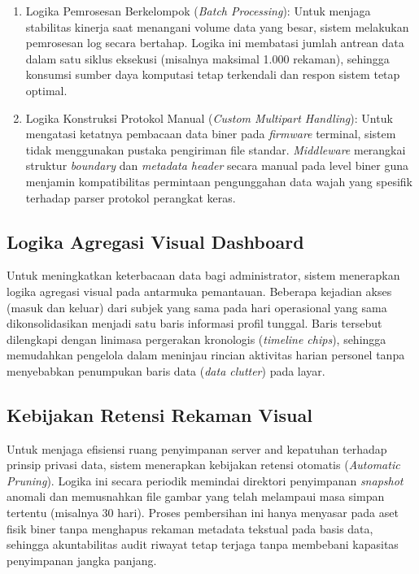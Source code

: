 \begin{enumerate}
    \item Logika Pemrosesan Berkelompok (\textit{Batch Processing}): Untuk menjaga stabilitas kinerja saat menangani volume data yang besar, sistem melakukan pemrosesan log secara bertahap. Logika ini membatasi jumlah antrean data dalam satu siklus eksekusi (misalnya maksimal 1.000 rekaman), sehingga konsumsi sumber daya komputasi tetap terkendali dan respon sistem tetap optimal.
    \item Logika Konstruksi Protokol Manual (\textit{Custom Multipart Handling}): Untuk mengatasi ketatnya pembacaan data biner pada \textit{firmware} terminal, sistem tidak menggunakan pustaka pengiriman file standar. \textit{Middleware} merangkai struktur \textit{boundary} dan \textit{metadata header} secara manual pada level biner guna menjamin kompatibilitas permintaan pengunggahan data wajah yang spesifik terhadap parser protokol perangkat keras.
\end{enumerate}

\subsection{Logika Agregasi Visual Dashboard}
Untuk meningkatkan keterbacaan data bagi administrator, sistem menerapkan logika agregasi visual pada antarmuka pemantauan. Beberapa kejadian akses (masuk dan keluar) dari subjek yang sama pada hari operasional yang sama dikonsolidasikan menjadi satu baris informasi profil tunggal. Baris tersebut dilengkapi dengan linimasa pergerakan kronologis (\textit{timeline chips}), sehingga memudahkan pengelola dalam meninjau rincian aktivitas harian personel tanpa menyebabkan penumpukan baris data (\textit{data clutter}) pada layar.

\subsection{Kebijakan Retensi Rekaman Visual}
Untuk menjaga efisiensi ruang penyimpanan server and kepatuhan terhadap prinsip privasi data, sistem menerapkan kebijakan retensi otomatis (\textit{Automatic Pruning}). Logika ini secara periodik memindai direktori penyimpanan \textit{snapshot} anomali dan memusnahkan file gambar yang telah melampaui masa simpan tertentu (misalnya 30 hari). Proses pembersihan ini hanya menyasar pada aset fisik biner tanpa menghapus rekaman metadata tekstual pada basis data, sehingga akuntabilitas audit riwayat tetap terjaga tanpa membebani kapasitas penyimpanan jangka panjang.

